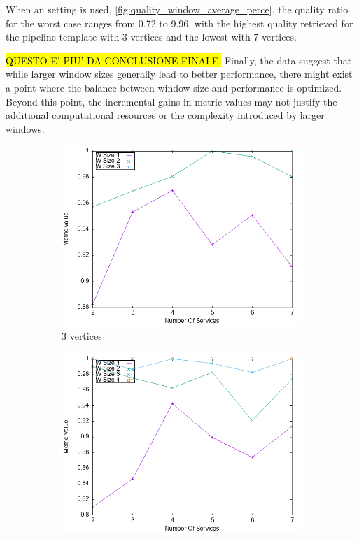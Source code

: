 When an \average setting is used, \cref{fig:quality_window_average_perce}, the quality ratio for the worst case ranges from 0.72 to 9.96, with the highest quality retrieved for the pipeline template with 3 vertices and the lowest with 7 vertices.



\hl{QUESTO E' PIU' DA CONCLUSIONE FINALE.} Finally, the data suggest that while larger window sizes generally lead to better performance, there might exist a point where the balance between window size and performance is optimized. Beyond this point, the incremental gains in metric values may not justify the additional computational resources or the complexity introduced by larger windows.


\begin{figure}[ht]
  \centering
  \begin{subfigure}{0.33\textwidth}
    \includegraphics[width=\textwidth]{Images/graphs/newwindow_quality_performance_diff_perce_n7_s7_20_100_n3.png}
    \caption{3 vertices}
    \label{fig:quality_window_perce_wide_3n}
  \end{subfigure}
  \hfill
  \begin{subfigure}{0.33\textwidth}
    \includegraphics[width=\textwidth]{Images/graphs/newwindow_quality_performance_diff_perce_n7_s7_20_100_n4}

\end{subfigure}
\end{figure}
